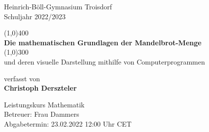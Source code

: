 \begin{titlepage}
  \begin{center}
    \vspace{1cm}

    Heinrich-Böll-Gymnasium Troisdorf\\
    Schuljahr 2022/2023

    \vspace{1cm}
    \Huge
    \line(1,0){400}\\
    \textbf{Die mathematischen Grundlagen der Mandelbrot-Menge}\\
    \line(1,0){300}\\

    \vspace{0.75cm}
    \Large
    und deren visuelle Darstellung mithilfe von Computerprogrammen

    \vspace{2cm}
    \large
    verfasst von\\
    \Large
    \textbf{Christoph Derszteler}

    \vfill
    \large
    Leistungskurs Mathematik\\
    Betreuer: Frau Dammers\\
    Abgabetermin: 23.02.2022 12:00 Uhr CET\\
  \end{center}
\end{titlepage}